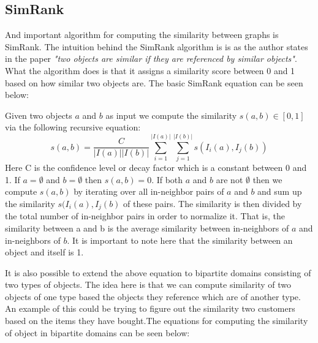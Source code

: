 \subsection{SimRank}
And important algorithm for computing the similarity between graphs is SimRank\cite{10.1145/775047.775126}. The intuition behind the SimRank algorithm is is as the author states in the paper \emph{"two objects are similar if they are referenced by similar objects"}\cite{10.1145/775047.775126}. What the algorithm does is that it assigns a similarity score between 0 and 1 based on how similar two objects are. The basic SimRank equation can be seen below:
\begin{definition}[SimRank]\label{def:simrank} Given two objects $a$ and $b$ as input we compute the similarity $s(a,b) \in [0,1]$ via the following recursive equation:
	\begin{equation}
	s(a,b)= \frac{C}{|I(a)||I(b)|}\sum^{|I(a)|}_{i=1}\sum^{|I(b)|}_{j=1}s(I_i(a),I_j(b))
	\end{equation}
	Here C is the confidence level or decay factor which is a constant between 0 and 1. If $a=\emptyset$ and $b= \emptyset$ then $s(a,b) = 0$. If both $a$ and $b$ are not $\emptyset$ then we compute $s(a,b)$ by iterating over all in-neighbor pairs of $a$ and $b$ and sum up the similarity $s(I_i(a),I_j(b)$ of these pairs. The similarity is then divided by the total number of in-neighbor pairs in order to normalize it. That is, the similarity between a and b is the average similarity between in-neighbors of $a$ and in-neighbors of $b$. It is important to note here that the similarity between an object and itself is 1\cite{10.1145/775047.775126}.
\end{definition}

It is also possible to extend the above equation to bipartite domains consisting of two types of objects. The idea here is that we can compute similarity of two objects of one type based the objects they reference which are of another type. An example of this could be trying to figure out the similarity two customers based on the items they have bought\cite{10.1145/775047.775126}.The equations for computing the similarity of object in bipartite domains can be seen below:

